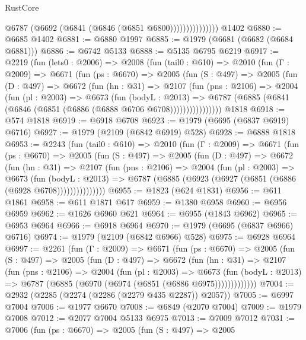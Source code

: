 \begin{lexlean}{RustCore}
\begin{coremodule}
                        @6787 (@6692 (@6841 (@6846 (@6851 @6800)))))))))))))))
    @1402
@6880 := @6685 @1402
@6881 := @6880 @1997
@6885 := @1979 (@6681 (@6682 (@6684 @6881)))
@6886 := @6742 @5133
@6888 := @5135 @6795 @6219
@6917 := @2219
    (fun (lets0 : @2006) =>
    @2008
      (fun (tail0 : @610) =>
      @2010
        (fun (Γ : @2009) =>
        @6671
          (fun (ps : @6670) =>
          @2005
            (fun (S : @497) =>
            @2005
              (fun (D : @497) =>
              @6672
                (fun (hn : @31) =>
                @2107
                  (fun (pns : @2106) =>
                  @2004
                    (fun (pl : @2003) =>
                    @6673
                      (fun (bodyL : @2013) =>
                      @6787 (@6885 (@6841 (@6846 (@6851 (@6886 (@6888 @6706 @6708))))))))))))))))
    @1818
@6918 := @574 @1818
@6919 := @6918 @6708
@6923 := @1979 (@6695 (@6837 @6919) @6716)
@6927 := @1979 (@2109 (@6842 @6919) @528)
@6928 := @6888 @1818
@6953 := @2243
    (fun (tail0 : @610) =>
    @2010
      (fun (Γ : @2009) =>
      @6671
        (fun (ps : @6670) =>
        @2005
          (fun (S : @497) =>
          @2005
            (fun (D : @497) =>
            @6672
              (fun (hn : @31) =>
              @2107
                (fun (pns : @2106) =>
                @2004
                  (fun (pl : @2003) =>
                  @6673
                    (fun (bodyL : @2013) =>
                    @6787 (@6885 (@6923 (@6927 (@6851 (@6886 (@6928 @6708)))))))))))))))
@6955 := @1823 (@624 @1831)
@6956 := @611 @1861
@6958 := @611 @1871 @617
@6959 := @1380 @6958
@6960 := @6956 @6959
@6962 := @1626 @6960 @621
@6964 := @6955 (@1843 @6962)
@6965 := @6953 @6964
@6966 := @6918 @6964
@6970 := @1979 (@6695 (@6837 @6966) @6716)
@6974 := @1979 (@2109 (@6842 @6966) @528)
@6975 := @6928 @6964
@6997 := @2261
    (fun (Γ : @2009) =>
    @6671
      (fun (ps : @6670) =>
      @2005
        (fun (S : @497) =>
        @2005
          (fun (D : @497) =>
          @6672
            (fun (hn : @31) =>
            @2107
              (fun (pns : @2106) =>
              @2004
                (fun (pl : @2003) =>
                @6673
                  (fun (bodyL : @2013) =>
                  @6787 (@6885 (@6970 (@6974 (@6851 (@6886 @6975)))))))))))))
@7004 := @2932 (@2285 (@2274 (@2286 (@2279 @435 @2287)) @2057))
@7005 := @6997 @7004
@7006 := @1977 @6670
@7008 := @6849 (@2070 @7004)
@7009 := @1979 @7008
@7012 := @2077 @7004 @5133 @6975
@7013 := @7009 @7012
@7031 := @7006
    (fun (ps : @6670) =>
    @2005
      (fun (S : @497) =>
      @2005

\end{coremodule}
\end{lexlean}
